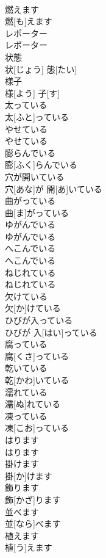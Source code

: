 \documentclass[8pt]{extreport}
\begin{document}
\begin{CJK}{UTF8}{min}
\\	燃えます	
\\	燃[も]えます		
\\	レポーター	
\\	レポーター		
\\	状態	
\\	状[じょう] 態[たい]		
\\	様子	
\\	様[よう] 子[す]		
\\	太っている	
\\	太[ふと]っている		
\\	やせている	
\\	やせている		
\\	膨らんでいる	
\\	膨[ふく]らんでいる		
\\	穴が開いている	
\\	穴[あな]が 開[あ]いている		
\\	曲がっている	
\\	曲[ま]がっている		
\\	ゆがんでいる	
\\	ゆがんでいる		
\\	へこんでいる	
\\	へこんでいる		
\\	ねじれている	
\\	ねじれている		
\\	欠けている	
\\	欠[か]けている		
\\	ひびが入っている	
\\	ひびが 入[はい]っている		
\\	腐っている	
\\	腐[くさ]っている		
\\	乾いている	
\\	乾[かわ]いている		
\\	濡れている	
\\	濡[ぬ]れている		
\\	凍っている	
\\	凍[こお]っている		
\\	はります	
\\	はります		
\\	掛けます	
\\	掛[か]けます		
\\	飾ります	
\\	飾[かざ]ります		
\\	並べます	
\\	並[なら]べます		
\\	植えます	
\\	植[う]えます		

\end{CJK}
\end{document}
